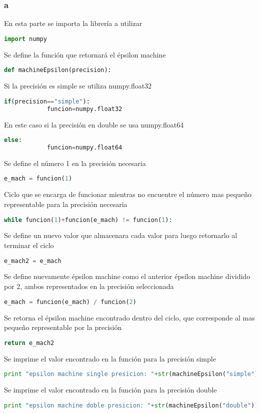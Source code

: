 \documentclass[a4paper,11pt]{article}
\begin{document}
\subsubsection{a}
En esta parte se importa la librería a utilizar
\begin{lstlisting}[frame=single, language=Python]
import numpy
\end{lstlisting}
Se define la función que retornará el épsilon machine
\begin{lstlisting}[frame=single, language=Python]
def machineEpsilon(precision):
\end{lstlisting}
Si la precisión es simple se utiliza numpy.float32
\begin{lstlisting}[frame=single, language=Python]
	if(precision=="simple"):          
			funcion=numpy.float32
\end{lstlisting}
En este caso si la precisión en double se usa numpy.float64
\begin{lstlisting}[frame=single, language=Python]
	else:                                                
			funcion=numpy.float64
\end{lstlisting}
Se define el número 1 en la precisión necesaria
\begin{lstlisting}[frame=single, language=Python]
	e_mach = funcion(1)
\end{lstlisting}       
Ciclo que se encarga de funcionar mientras no encuentre el número mas pequeño representable para la precisión necesaria
\begin{lstlisting}[frame=single, language=Python]
	while funcion(1)+funcion(e_mach) != funcion(1):
\end{lstlisting}
Se define un nuevo valor que almacenara cada valor para luego retornarlo al terminar el ciclo
\begin{lstlisting}[frame=single, language=Python]
			e_mach2 = e_mach
\end{lstlisting}
Se define nuevamente épsilon machine como el anterior épsilon machine dividido por 2, ambos representados en la precisión seleccionada 
\begin{lstlisting}[frame=single, language=Python]
			e_mach = funcion(e_mach) / funcion(2) 
\end{lstlisting}
Se retorna el épsilon machine encontrado dentro del ciclo, que corresponde al mas pequeño representable por la precisión         
\begin{lstlisting}[frame=single, language=Python]
	return e_mach2
\end{lstlisting}      
Se imprime el valor encontrado en la función para la precisión simple
\begin{lstlisting}[frame=single, language=Python]
print "epsilon machine single presicion: "+str(machineEpsilon("simple"))
\end{lstlisting}
Se imprime el valor encontrado en la función para la precisión double 
\begin{lstlisting}[frame=single, language=Python]
print "epsilon machine doble presicion: "+str(machineEpsilon("double")) 
\end{lstlisting}
\end{document}
